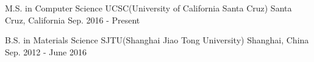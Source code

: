 

\begin{cventries}

  \cventry
    {M.S. in Computer Science} %
    {UCSC(University of California Santa Cruz)} %
    {Santa Cruz, California} %
    {Sep. 2016 - Present} %
    {
    }


  \cventry
    {B.S. in Materials Science} %
    {SJTU(Shanghai Jiao Tong University)} %
    {Shanghai, China} %
    {Sep. 2012 - June 2016} %
    {
    }

\end{cventries}
